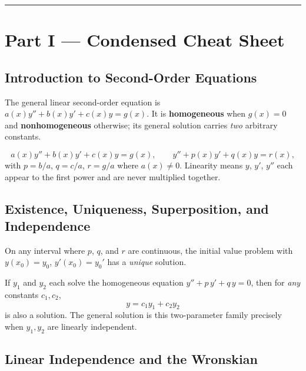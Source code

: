 \vspace{0.6em}
\hrule
\vspace{0.6em}

{}
\section*{Part I --- Condensed Cheat Sheet}
\setcounter{section}{9}   %

\subsection{Introduction to Second-Order Equations}

The general linear second-order equation is
$a(x)y'' + b(x)y' + c(x)y = g(x)$. It is \textbf{homogeneous} when $g(x)=0$ and
\textbf{nonhomogeneous} otherwise; its general solution carries \emph{two}
arbitrary constants.

\begin{formulabox}
\[ a(x)y'' + b(x)y' + c(x)y = g(x), \qquad
   y'' + p(x)y' + q(x)y = r(x), \]
with $p=b/a$, $q=c/a$, $r=g/a$ where $a(x)\neq 0$. Linearity means $y$, $y'$, $y''$
each appear to the first power and are never multiplied together.
\end{formulabox}

\subsection{Existence, Uniqueness, Superposition, and Independence}

On any interval where $p$, $q$, and $r$ are continuous, the initial value problem
with $y(x_0)=y_0$, $y'(x_0)=y_0'$ has a \emph{unique} solution.

\begin{formulabox}
If $y_1$ and $y_2$ each solve the homogeneous equation
$y''+p\,y'+q\,y=0$, then for \emph{any} constants $c_1,c_2$,
\[ y = c_1 y_1 + c_2 y_2 \]
is also a solution. The general solution is this two-parameter family precisely
when $y_1,y_2$ are linearly independent.
\end{formulabox}

\subsection{Linear Independence and the Wronskian}

